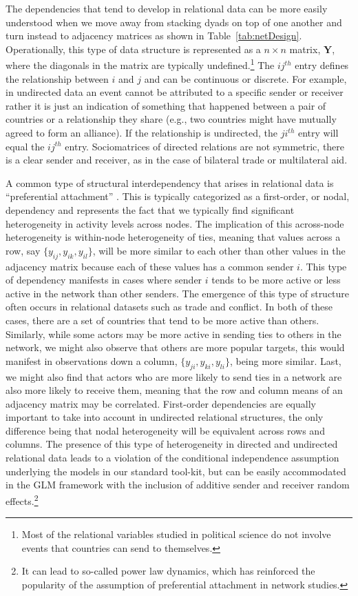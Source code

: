 The dependencies that tend to develop in relational data can be more easily understood when we move away from stacking dyads on top of one another and turn instead to adjacency matrices as shown in Table~\ref{tab:netDesign}. Operationally, this type of data structure is represented as a $n \times n$ matrix, $\mathbf{Y}$, where the diagonals in the matrix are typically undefined.\footnote{Most of the relational variables studied in political science do not involve events that countries can send to themselves.} The $ij^{th}$ entry defines the relationship between $i$ and $j$ and can be continuous or discrete. For example, in undirected data an event cannot be attributed to a specific sender or receiver rather it is just an indication of something that happened between a pair of countries or a relationship they share (e.g., two countries might have mutually agreed to form an alliance). If the relationship is undirected, the $ji^{th}$ entry will equal the $ij^{th}$ entry. Sociomatrices of directed relations are not symmetric, there is a clear sender and receiver, as in the case of bilateral trade or multilateral aid.

A common type of structural interdependency that arises in relational data is ``preferential attachment'' \citep{barabasi:reka:1999,reka:etal:1999}. This is typically categorized as a first-order, or nodal, dependency and represents the fact that we typically find significant heterogeneity in activity levels across nodes. The implication of this across-node heterogeneity is within-node heterogeneity of ties, meaning that values across a row, say $\{y_{ij},y_{ik},y_{il}\}$, will be more similar to each other than other values in the adjacency matrix because each of these values has a common sender $i$. This type of dependency manifests in cases where sender $i$ tends to be more active or less active in the network than other senders. The emergence of this type of structure often occurs in relational datasets such as trade and conflict. In both of these cases, there are a set of countries that tend to be more active than others. Similarly, while some actors may be more active in sending ties to others in the network, we might also observe that others are more popular targets, this would manifest in observations down a column, $\{y_{ji},y_{ki},y_{li}\}$, being more similar. Last, we might also find that actors who are more likely to send ties in a network are also more likely to receive them, meaning that the row and column means of an adjacency matrix may be correlated. First-order dependencies are equally important to take into account in undirected relational structures, the only difference being that nodal heterogeneity will be equivalent across rows and columns. The presence of this type of heterogeneity in directed and undirected relational data leads to a violation of the conditional independence assumption underlying the models in our standard tool-kit, but can be easily accommodated in the GLM framework with the inclusion of additive sender and receiver random effects.\footnote{It can lead to so-called power law dynamics, which has reinforced the popularity of the assumption of preferential attachment in network studies.}

